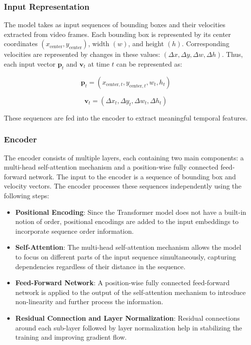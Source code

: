\documentclass[12pt,oneside]{book} %
\begin{document}
\subsubsection{Input Representation}

The model takes as input sequences of bounding boxes and their velocities
extracted from video frames. Each bounding box is represented by its center
coordinates $(x_{\text{center}}, y_{\text{center}})$, width $(w)$, and height
$(h)$. Corresponding velocities are represented by changes in these values:
$(\Delta x, \Delta y, \Delta w, \Delta h)$. Thus, each input vector
$\mathbf{p}_t$ and $\mathbf{v}_t$ at time $t$ can be represented as:

\begin{equation}
    \mathbf{p}_t = (x_{\text{center}, t}, y_{\text{center}, t}, w_t, h_t)
\end{equation}

\begin{equation}
    \mathbf{v}_t = (\Delta x_t, \Delta y_t, \Delta w_t, \Delta h_t)
\end{equation}

These sequences are fed into the encoder to extract meaningful temporal
features.

\subsubsection{Encoder}

The encoder consists of multiple layers, each containing two main components: a
multi-head self-attention mechanism and a position-wise fully connected
feed-forward network. The input to the encoder is a sequence of bounding box
and velocity vectors. The encoder processes these sequences independently using
the following steps:

\begin{itemize}
    \item \textbf{Positional Encoding}: Since the Transformer model does not have a built-in notion of order, positional encodings are added to the input embeddings to incorporate sequence order information.
    \item \textbf{Self-Attention}: The multi-head self-attention mechanism allows the model to focus on different parts of the input sequence simultaneously, capturing dependencies regardless of their distance in the sequence.
    \item \textbf{Feed-Forward Network}: A position-wise fully connected feed-forward network is applied to the output of the self-attention mechanism to introduce non-linearity and further process the information.
    \item \textbf{Residual Connection and Layer Normalization}: Residual connections around each sub-layer followed by layer normalization help in stabilizing the training and improving gradient flow.
\end{itemize}
\end{document}
